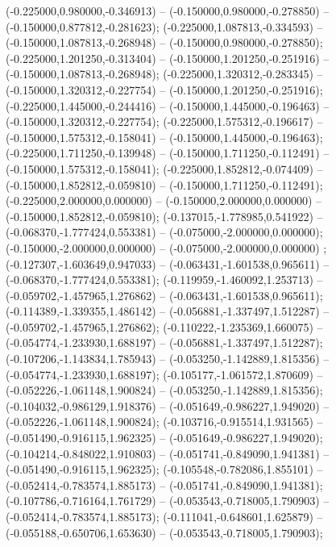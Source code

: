  (-0.225000,0.980000,-0.346913) -- (-0.150000,0.980000,-0.278850) -- (-0.150000,0.877812,-0.281623);
 (-0.225000,1.087813,-0.334593) -- (-0.150000,1.087813,-0.268948) -- (-0.150000,0.980000,-0.278850);
 (-0.225000,1.201250,-0.313404) -- (-0.150000,1.201250,-0.251916) -- (-0.150000,1.087813,-0.268948);
 (-0.225000,1.320312,-0.283345) -- (-0.150000,1.320312,-0.227754) -- (-0.150000,1.201250,-0.251916);
 (-0.225000,1.445000,-0.244416) -- (-0.150000,1.445000,-0.196463) -- (-0.150000,1.320312,-0.227754);
 (-0.225000,1.575312,-0.196617) -- (-0.150000,1.575312,-0.158041) -- (-0.150000,1.445000,-0.196463);
 (-0.225000,1.711250,-0.139948) -- (-0.150000,1.711250,-0.112491) -- (-0.150000,1.575312,-0.158041);
 (-0.225000,1.852812,-0.074409) -- (-0.150000,1.852812,-0.059810) -- (-0.150000,1.711250,-0.112491);
 (-0.225000,2.000000,0.000000) -- (-0.150000,2.000000,0.000000) -- (-0.150000,1.852812,-0.059810);
 (-0.137015,-1.778985,0.541922) -- (-0.068370,-1.777424,0.553381) -- (-0.075000,-2.000000,0.000000);
 (-0.150000,-2.000000,0.000000) -- (-0.075000,-2.000000,0.000000) ;
 (-0.127307,-1.603649,0.947033) -- (-0.063431,-1.601538,0.965611) -- (-0.068370,-1.777424,0.553381);
 (-0.119959,-1.460092,1.253713) -- (-0.059702,-1.457965,1.276862) -- (-0.063431,-1.601538,0.965611);
 (-0.114389,-1.339355,1.486142) -- (-0.056881,-1.337497,1.512287) -- (-0.059702,-1.457965,1.276862);
 (-0.110222,-1.235369,1.660075) -- (-0.054774,-1.233930,1.688197) -- (-0.056881,-1.337497,1.512287);
 (-0.107206,-1.143834,1.785943) -- (-0.053250,-1.142889,1.815356) -- (-0.054774,-1.233930,1.688197);
 (-0.105177,-1.061572,1.870609) -- (-0.052226,-1.061148,1.900824) -- (-0.053250,-1.142889,1.815356);
 (-0.104032,-0.986129,1.918376) -- (-0.051649,-0.986227,1.949020) -- (-0.052226,-1.061148,1.900824);
 (-0.103716,-0.915514,1.931565) -- (-0.051490,-0.916115,1.962325) -- (-0.051649,-0.986227,1.949020);
 (-0.104214,-0.848022,1.910803) -- (-0.051741,-0.849090,1.941381) -- (-0.051490,-0.916115,1.962325);
 (-0.105548,-0.782086,1.855101) -- (-0.052414,-0.783574,1.885173) -- (-0.051741,-0.849090,1.941381);
 (-0.107786,-0.716164,1.761729) -- (-0.053543,-0.718005,1.790903) -- (-0.052414,-0.783574,1.885173);
 (-0.111041,-0.648601,1.625879) -- (-0.055188,-0.650706,1.653630) -- (-0.053543,-0.718005,1.790903);
